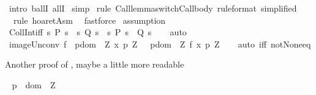 \begin{isabellebody}
\isamarkupfalse%
\ {\isacharparenleft}intro\ ballI\ allI{\isacharparenright}\isanewline
{}\isamarkupfalse%
\ simp\isanewline
{}\isamarkupfalse%
\ {\isacharparenleft}rule\ Call{\isacharunderscore}lemma{\isacharunderscore}switch{\isacharunderscore}Call{\isacharunderscore}body\ {\isacharbrackleft}rule{\isacharunderscore}format{\isacharcomma}\ simplified{\isacharbrackright}{\isacharparenright}\isanewline
{}\isamarkupfalse%
\ \ {\isacharparenleft}rule\ hoaret{\isachardot}Asm{\isacharparenright}\isanewline
{}\isamarkupfalse%
\ \ fastforce\isanewline
{}\isamarkupfalse%
\ assumption\isanewline
{}\isamarkupfalse%
%
\endisatagproof
{\isafoldproof}%
%
\isadelimproof
\isanewline
%
\endisadelimproof
\isanewline
\isanewline
{}\isamarkupfalse%
\ CollInt{\isacharunderscore}iff{\isacharcolon}\ {\isachardoublequoteopen}{\isacharbraceleft}s{\isachardot}\ P\ s{\isacharbraceright}\ {\isasyminter}\ {\isacharbraceleft}s{\isachardot}\ Q\ s{\isacharbraceright}\ {\isacharequal}\ {\isacharbraceleft}s{\isachardot}\ P\ s\ {\isasymand}\ Q\ s{\isacharbraceright}{\isachardoublequoteclose}\isanewline
%
\isadelimproof
\ \ %
\endisadelimproof
%
\isatagproof
{}\isamarkupfalse%
\ auto%
\endisatagproof
{\isafoldproof}%
%
\isadelimproof
\isanewline
%
\endisadelimproof
\isanewline
{}\isamarkupfalse%
\ image{\isacharunderscore}Un{\isacharunderscore}conv{\isacharcolon}\ {\isachardoublequoteopen}f\ {\isacharbackquote}\ {\isacharparenleft}{\isasymUnion}p{\isasymin}dom\ {\isasymGamma}{\isachardot}\ {\isasymUnion}Z{\isachardot}\ {\isacharbraceleft}x\ p\ Z{\isacharbraceright}{\isacharparenright}\ {\isacharequal}\ \ {\isacharparenleft}{\isasymUnion}p{\isasymin}dom\ {\isasymGamma}{\isachardot}\ {\isasymUnion}Z{\isachardot}\ {\isacharbraceleft}f\ {\isacharparenleft}x\ p\ Z{\isacharparenright}{\isacharbraceright}{\isacharparenright}{\isachardoublequoteclose}\isanewline
%
\isadelimproof
\ \ %
\endisadelimproof
%
\isatagproof
{}\isamarkupfalse%
\ {\isacharparenleft}auto\ iff{\isacharcolon}\ not{\isacharunderscore}None{\isacharunderscore}eq{\isacharparenright}%
\endisatagproof
{\isafoldproof}%
%
\isadelimproof
%
\endisadelimproof
%
\begin{isamarkuptext}%
Another proof of , maybe a little more readable%
\end{isamarkuptext}\isamarkuptrue%
\isamarkupfalse%
\ \isanewline
{\isachardoublequoteopen}{\isasymforall}p\ {\isasymin}\ dom\ {\isasymGamma}{\isachardot}\ {\isasymforall}Z{\isachardot}\ \isanewline

\end{isabellebody}
